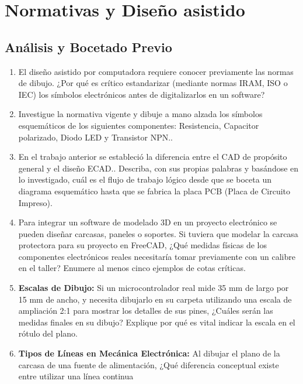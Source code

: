 \documentclass[../main]{subfiles}
\begin{document}
\chapter{Normativas y Diseño asistido}
\section{Análisis y Bocetado Previo}
\begin{enumerate}
  \item El diseño asistido por computadora requiere conocer
    previamente las normas de dibujo. ¿Por qué es crítico
    estandarizar (mediante normas IRAM, ISO o IEC) los símbolos
    electrónicos antes de digitalizarlos en un software?
  \item Investigue la normativa vigente y dibuje a mano alzada los
    símbolos esquemáticos de los siguientes componentes: Resistencia,
    Capacitor polarizado, Diodo LED y Transistor NPN..
  \item En el trabajo anterior se estableció la diferencia entre el
    CAD de propósito general y el diseño ECAD.. Describa, con
    sus propias palabras y basándose en lo investigado, cuál es el
    flujo de trabajo lógico desde que se boceta un diagrama
    esquemático hasta que se fabrica la placa PCB (Placa de Circuito
    Impreso).
  \item Para integrar un software de modelado 3D en un proyecto
    electrónico se pueden diseñar carcasas, paneles o soportes. Si
    tuviera que modelar la carcasa protectora para su proyecto en
    FreeCAD, ¿Qué medidas físicas de los componentes electrónicos
    reales necesitaría tomar previamente con un calibre en el taller?
    Enumere al menos cinco ejemplos de cotas críticas.
  \item \textbf{Escalas de Dibujo:} Si un microcontrolador real mide
    35 mm de largo por 15 mm de ancho, y necesita dibujarlo en su
    carpeta utilizando una escala de ampliación 2:1 para mostrar los
    detalles de sus pines, ¿Cuáles serán las medidas finales en su
    dibujo? Explique por qué es vital indicar la escala en el rótulo del plano.
  \item \textbf{Tipos de Líneas en Mecánica Electrónica:} Al dibujar
    el plano de la carcasa de una fuente de alimentación, ¿Qué
    diferencia conceptual existe entre utilizar una línea continua

\end{enumerate}
\end{document}
